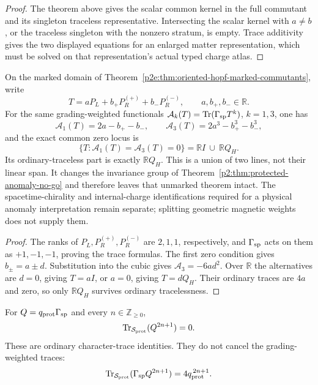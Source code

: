 \documentclass[12pt,a4paper]{article}
\begin{document}
\begin{proof}
The theorem above gives the scalar common kernel in the full commutant and its
singleton traceless representative.  Intersecting the scalar kernel with
\(a\ne b\), or the traceless singleton with the nonzero stratum, is empty.
Trace additivity gives the two displayed equations for an enlarged matter
representation, which must be solved on that representation's actual typed
charge atlas.
\end{proof}

\begin{theorem}
\label{p2e:thm:marked-hopf-weighted-trace-locus}
On the marked domain of
Theorem~\ref{p2e:thm:oriented-hopf-marked-commutants}, write
\[
 T=aP_L+b_+P_R^{(+)}+b_-P_R^{(-)},\qquad a,b_+,b_-\in\mathbb R.
\]
For the same grading-weighted functionals
\(\mathcal A_k(T)=\operatorname{Tr}(\Gamma_{\rm sp}T^k)\), \(k=1,3\), one has
\[
 \mathcal A_1(T)=2a-b_+-b_-,\qquad
 \mathcal A_3(T)=2a^3-b_+^3-b_-^3,
\]
and the exact common zero locus is
\[
 \boxed{\{T:\mathcal A_1(T)=\mathcal A_3(T)=0\}
 =\mathbb RI\ \cup\ \mathbb RQ_H.}
\]
Its ordinary-traceless part is exactly \(\mathbb RQ_H\).
This is a union of two lines, not their linear span.
It changes the invariance group of
Theorem~\ref{p2:thm:protected-anomaly-no-go} and therefore leaves that
unmarked theorem intact.  The spacetime-chirality and internal-charge
identifications required for a physical anomaly interpretation remain
separate; splitting geometric magnetic weights does not supply them.
\end{theorem}

\begin{proof}
The ranks of \(P_L,P_R^{(+)},P_R^{(-)}\) are \(2,1,1\), respectively,
and \(\Gamma_{\rm sp}\) acts on them as \(+1,-1,-1\), proving the
trace formulas.  The first zero condition gives \(b_\pm=a\pm d\).
Substitution into the cubic gives \(\mathcal A_3=-6ad^2\).  Over
\(\mathbb R\) the alternatives are \(d=0\), giving \(T=aI\), or
\(a=0\), giving \(T=dQ_H\).  Their ordinary traces are \(4a\) and zero,
so only \(\mathbb RQ_H\) survives ordinary tracelessness.
\end{proof}

\begin{lemma}
\label{p2:lem:odd-character-trace}
For \(Q=q_{\rm prot}\Gamma_{\rm sp}\) and every
\(n\in\mathbb Z_{\ge0}\),
\[
        \operatorname{Tr}_{\mathcal S_{\rm prot}}(Q^{2n+1})=0.
\]
These are ordinary character-trace identities.  They do not cancel the
grading-weighted traces:
\[
        \operatorname{Tr}_{\mathcal S_{\rm prot}}
        (\Gamma_{\rm sp}Q^{2n+1})
        =4q_{\rm prot}^{\,2n+1}.
\]
\end{lemma}
\end{document}
